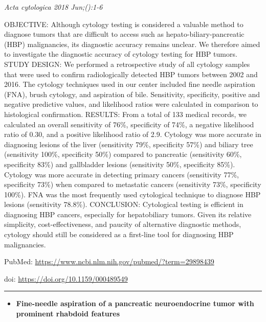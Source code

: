 \documentclass[]{article}
\providecommand{\tightlist}{%
  \setlength{\itemsep}{0pt}\setlength{\parskip}{0pt}}
\begin{document}
\emph{Acta cytologica 2018 Jun;():1-6}

OBJECTIVE: Although cytology testing is considered a valuable method to
diagnose tumors that are difficult to access such as
hepato-biliary-pancreatic (HBP) malignancies, its diagnostic accuracy
remains unclear. We therefore aimed to investigate the diagnostic
accuracy of cytology testing for HBP tumors. STUDY DESIGN: We performed
a retrospective study of all cytology samples that were used to confirm
radiologically detected HBP tumors between 2002 and 2016. The cytology
techniques used in our center included fine needle aspiration (FNA),
brush cytology, and aspiration of bile. Sensitivity, specificity,
positive and negative predictive values, and likelihood ratios were
calculated in comparison to histological confirmation. RESULTS: From a
total of 133 medical records, we calculated an overall sensitivity of
76\%, specificity of 74\%, a negative likelihood ratio of 0.30, and a
positive likelihood ratio of 2.9. Cytology was more accurate in
diagnosing lesions of the liver (sensitivity 79\%, specificity 57\%) and
biliary tree (sensitivity 100\%, specificity 50\%) compared to
pancreatic (sensitivity 60\%, specificity 83\%) and gallbladder lesions
(sensitivity 50\%, specificity 85\%). Cytology was more accurate in
detecting primary cancers (sensitivity 77\%, specificity 73\%) when
compared to metastatic cancers (sensitivity 73\%, specificity 100\%).
FNA was the most frequently used cytological technique to diagnose HBP
lesions (sensitivity 78.8\%). CONCLUSION: Cytological testing is
efficient in diagnosing HBP cancers, especially for hepatobiliary
tumors. Given its relative simplicity, cost-effectiveness, and paucity
of alternative diagnostic methods, cytology should still be considered
as a first-line tool for diagnosing HBP malignancies.

PubMed: \url{https://www.ncbi.nlm.nih.gov/pubmed/?term=29898439}

doi: \url{https://doi.org/10.1159/000489549}

{}

{}

\begin{center}\rule{0.5\linewidth}{\linethickness}\end{center}

\begin{itemize}
\tightlist
\item
  \textbf{Fine-needle aspiration of a pancreatic neuroendocrine tumor
  with prominent rhabdoid features}
\end{itemize}
\end{document}
